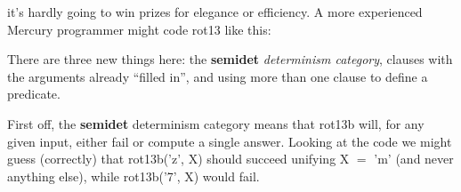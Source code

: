 \documentclass[a4paper,11pt,notitlepage,onecolumn]{book}
\begin{document}
it's hardly going to win prizes for elegance or efficiency.  A more
experienced Mercury programmer might code \textsf{rot13} like this:
\begin{small}

\begin{ptabular}
\nextline
\nextline
{}
\nextline
\nextline
{}
\nextline
\nextline
{}
\nextline
{}
\nextline
{}
\nextline
{}
\nextline
{}
\nextline
{}
\nextline
{}
\nextline
{}
\nextline
\end{ptabular}

\end{small}
There are three new things here: the \textsf{\textbf{semidet}} \emph{determinism category},
clauses with the arguments already ``filled in'', and using more than one
clause to define a predicate.

First off, the \textsf{\textbf{semidet}} determinism category means that \textsf{rot13b} will, for
any given input, either fail or compute a single answer.  Looking at the
code we might guess (correctly) that \textsf{rot13b('z', X)} should succeed
unifying \textsf{X {\ensuremath{=}} 'm'} (and never anything else), while \textsf{rot13b('7', X)}
would fail.
\end{document}
